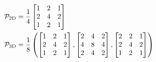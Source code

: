             \begin{equation}
                \centering
                \begin{aligned}
                    \mathcal{P}_{2\text{D}} &= \frac{1}{4}
                    \begin{bmatrix}
                        1 & 2 & 1
                        \\
                        2 & 4 & 2
                        \\
                        1 & 2 & 1
                    \end{bmatrix}
                    \\
                    \mathcal{P}_{3\text{D}} &= \frac{1}{8} \left(
                    \begin{bmatrix}
                        1 & 2 & 1
                        \\
                        2 & 4 & 2
                        \\
                        1 & 2 & 1
                    \end{bmatrix}
                    ,
                    \begin{bmatrix}
                        2 & 4 & 2
                        \\
                        4 & 8 & 4
                        \\
                        2 & 4 & 2
                    \end{bmatrix}
                    ,
                    \begin{bmatrix}
                        2 & 2 & 1
                        \\
                        2 & 4 & 2
                        \\
                        1 & 2 & 1
                    \end{bmatrix}
                    \right)
                    \label{eq:prolongation_stencils}
                \end{aligned}
            \end{equation}
